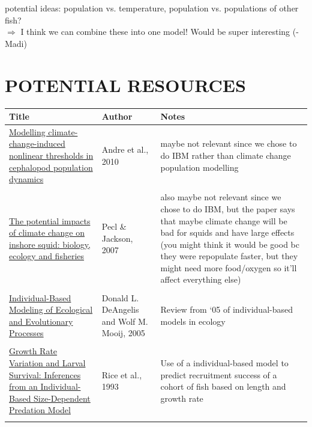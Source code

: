 \documentclass[12pt]{article}
\begin{document}
potential ideas: population vs. temperature, population vs. populations of other fish?
\\$\Rightarrow$ I think we can combine these into one model! Would be super interesting (-Madi)



\section{POTENTIAL RESOURCES} %
\begin{longtable}{p{2.0in}|p{1.0in}|p{2.5in}}
    \centering
         Title  & Author & Notes \\ \hline
         
        \href{https://onlinelibrary.wiley.com/doi/abs/10.1111/j.1365-2486.2010.02223.x}{Modelling climate-change-induced nonlinear thresholds in cephalopod population dynamics} & Andre et al., 2010 & maybe not relevant since we chose to do IBM rather than climate change population modelling \\ \\
        
        \href{https://link.springer.com/article/10.1007/s11160-007-9077-3}{The potential impacts of climate change on inshore squid: biology, ecology and fisheries} & Pecl \& Jackson, 2007 & also maybe not relevant since we chose to do IBM, but the paper says that maybe climate change will be bad for squids and have large effects (you might think it would be good bc they were repopulate faster, but they might need more food/oxygen so it'll affect everything else) \\ \\
        
        \href{https://www.annualreviews.org/content/journals/10.1146/annurev.ecolsys.36.102003.152644}{Individual-Based Modeling of Ecological and Evolutionary Processes} & Donald L. DeAngelis and Wolf M. Mooij, 2005 &  Review from `05 of individual-based models in ecology \\ \\

        \href{https://cdnsciencepub.com/doi/abs/10.1139/f93-015}{Growth Rate Variation and Larval Survival: Inferences from an Individual-Based Size-Dependent Predation Model} & Rice et al., 1993 & Use of a individual-based model to predict recruitment success of a cohort of fish based on length and growth rate\\ \\


\end{longtable}
\end{document}
